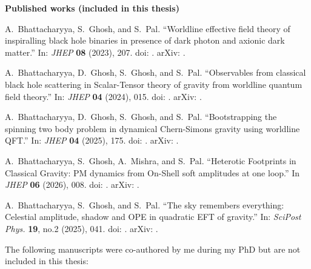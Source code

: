 \vspace{0.45em}
\textbf{Published works (included in this thesis)}
\begin{enumerate}[label={[\arabic*]},leftmargin=2.3em,itemsep=0.52em]
  \item A.~Bhattacharyya, S.~Ghosh, and S.~Pal.
  ``Worldline effective field theory of inspiralling black hole binaries in
  presence of dark photon and axionic dark matter.'' In:
  \textit{JHEP} \textbf{08} (2023), 207.
  doi: .
  arXiv: .

  \item A.~Bhattacharyya, D.~Ghosh, S.~Ghosh, and S.~Pal.
  ``Observables from classical black hole scattering in Scalar-Tensor theory
  of gravity from worldline quantum field theory.'' In:
  \textit{JHEP} \textbf{04} (2024), 015.
  doi: .
  arXiv: .

  \item A.~Bhattacharyya, D.~Ghosh, S.~Ghosh, and S.~Pal.
  ``Bootstrapping the spinning two body problem in dynamical Chern-Simons
  gravity using worldline QFT.'' In:
  \textit{JHEP} \textbf{04} (2025), 175.
  doi: .
  arXiv: .
  \item A.~Bhattacharyya, S.~Ghosh, A.~Mishra, and S.~Pal.
  ``Heterotic Footprints in Classical Gravity: PM dynamics from On-Shell soft
  amplitudes at one loop.'' In \textit{JHEP} \textbf{06} (2026), 008.
  doi: . arXiv: .

  \item A.~Bhattacharyya, S.~Ghosh, and S.~Pal.
  ``The sky remembers everything: Celestial amplitude, shadow and OPE in
  quadratic EFT of gravity.'' In:
  \textit{SciPost Phys.} \textbf{19}, no.2 (2025), 041.
  doi: .
  arXiv: .
\end{enumerate}

The following manuscripts were co-authored by me during my PhD but are not
included in this thesis:

